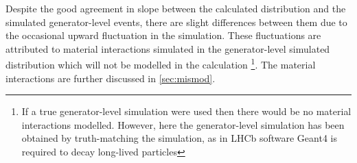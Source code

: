 Despite the good agreement in slope between the calculated distribution and the simulated generator-level events, there are slight differences between them due to the occasional upward fluctuation in the simulation. These fluctuations are attributed to material interactions simulated in the generator-level simulated distribution which will not be modelled in the calculation \footnote{If a true generator-level simulation were used then there would be no material interactions modelled. However, here the generator-level simulation has been obtained by truth-matching the simulation, as in LHCb software Geant4 is required to decay long-lived particles}. The material interactions are further discussed in \autoref{sec:mismod}. %






    
  


